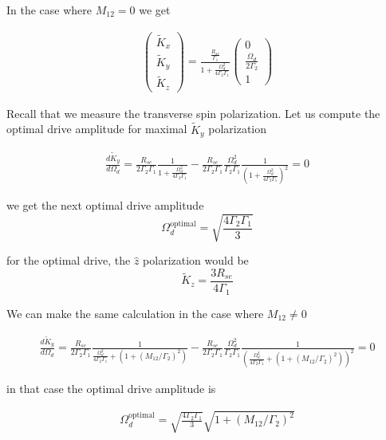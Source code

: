 \documentclass{article}
\begin{document}
In the case where $M_{12}=0$ we get

\begin{align}
    \left(\begin{array}{c}
        \tilde{K}_{x}\\
        \tilde{K}_{y}\\
        \tilde{K}_{z} 
    \end{array}\right)=
    \frac{\frac{R_{se}}{\Gamma_1}}{1+\frac{\Omega_d^2}{4\Gamma_2\Gamma_1}}
    \left(\begin{array}{c}
      0 \\
       \frac{\Omega_d}{2\Gamma_2}\\
         1
    \end{array}\right)
\end{align}

Recall that we measure the transverse spin polarization. Let us compute the optimal drive amplitude for maximal $\tilde{K}_y$ polarization

\begin{align}
    \frac{d\tilde{K}_{y}}{d \Omega_d} = \frac{R_{se}}{2\Gamma_2\Gamma_1}\frac{1}{1+\frac{\Omega_d^2}{4\Gamma_2\Gamma_1}} - \frac{R_{se}}{2\Gamma_2\Gamma_1}\frac{\Omega_d^2}{\Gamma_2\Gamma_1} \frac{1}{\left(1+\frac{\Omega_d^2}{4\Gamma_2\Gamma_1}\right)^2}=0
\end{align}

we get the next optimal drive amplitude $$\Omega_d^{\text{optimal}} = \sqrt{\frac{4\Gamma_2\Gamma_1}{3}}$$

for the optimal drive, the $\hat{z}$ polarization would be
$$\tilde{K}_{z} = \frac{3R_{se}}{4\Gamma_1}$$

We can make the same calculation in the case where $M_{12}\neq 0$

\begin{align}
    \frac{d\tilde{K}_{y}}{d \Omega_d} = \frac{R_{se}}{2\Gamma_2\Gamma_1}\frac{1}{\frac{\Omega_d^2}{4\Gamma_2\Gamma_1} + \left(1 + \left(M_{12}/\Gamma_2\right)^2\right)} - \frac{R_{se}}{2\Gamma_2\Gamma_1}\frac{\Omega_d^2}{\Gamma_2\Gamma_1} \frac{1}{\left(\frac{\Omega_d^2}{4\Gamma_2\Gamma_1} + \left(1 + \left(M_{12}/\Gamma_2\right)^2\right)\right)^2}=0
\end{align}

in that case the optimal drive amplitude is

\begin{align}
    \Omega_d^{\text{optimal}} =\sqrt{\frac{4\Gamma_2\Gamma_1}{3}}\sqrt{1 + \left(M_{12}/\Gamma_2\right)^2}\label{eq:optimal_drive}
\end{align}
\end{document}
